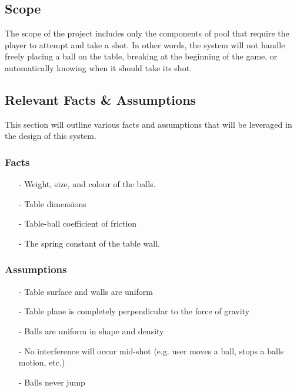 \documentclass[titlepage]{article}
\begin{document}
\subsection{Scope}
The scope of the project includes only the components of pool that require the player to attempt and take a shot. In other words, the system will not handle freely placing a ball on the table, breaking at the beginning of the game, or automatically knowing when it should take its shot.

\subsection{Relevant Facts \& Assumptions}
This section will outline various facts and assumptions that will be leveraged in the design of this system.
\subsubsection{Facts}
\begin{itemize}
	\item[-] Weight, size, and colour of the balls.
	\item[-] Table dimensions
	\item[-] Table-ball coefficient of friction
	\item[-] The spring constant of the table wall.
\end{itemize}
\subsubsection{Assumptions}
\begin{itemize}
	\item[-] Table surface and walls are uniform
	\item[-] Table plane is completely perpendicular to the force of gravity
	\item[-] Balls are uniform in shape and density
	\item[-] No interference will occur mid-shot (e.g. user moves a ball, stops a balls motion, etc.)
	\item[-] Balls never jump
\end{itemize}
\end{document}
